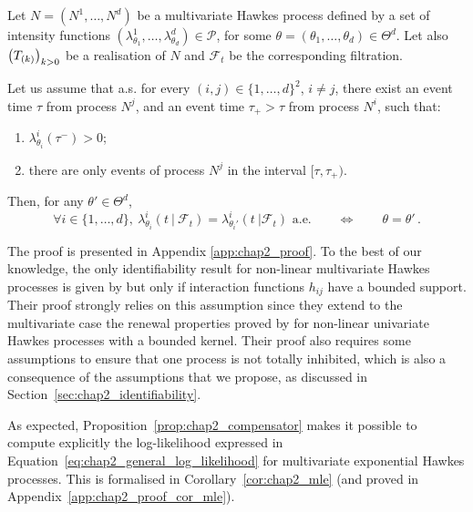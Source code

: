\begin{theorem}[Identifiability]\label{th:chap2_identifiability}
    Let $N=(N^1, \ldots, N^d)$ be a multivariate Hawkes process defined by a set of intensity functions $(\lambda^1_{\theta_1}, \dots, \lambda^d_{\theta_d}) \in \mathcal P$, for some $\theta = (\theta_1, \dots, \theta_d) \in \Theta^d$.
    Let also $\left(T_{(k)} \right)_{k>0}$ be a realisation of $N$ and $\mathcal{F}_t$ be the corresponding filtration.
    
    Let us assume that a.s. for every $(i, j) \in \{1, \dots, d\}^2$, $i\neq j$,
    there exist an event time \(\tau\) from process \(N^j\),
    and an event time \(\tau_+ > \tau\) from process \(N^i\), such that:
    \begin{enumerate}
        \item \label{hyp:chap2_ii} $\lambda_{\theta_i}^i(\tau^-) > 0$;
        \item \label{hyp:chap2_iii} there are only events of process $N^j$ in the interval $[\tau, \tau_+)$.
    \end{enumerate} 
    
    Then, for any $\theta' \in \Theta^d$,
    \[
      \forall i \in \{1, \dots, d\},~
      \lambda_{\theta_i}^i(t ~|~ \mathcal{F}_t) = \lambda_{\theta_i'}^i(t ~| \mathcal{F}_t) \text{ a.e.}
      \qquad
      \iff
      \qquad
      \theta = \theta' \,.
    \]
\end{theorem}

The proof is presented in Appendix \ref{app:chap2_proof}. To the best of our knowledge, the only identifiability result for non-linear multivariate Hawkes processes is given by \textcite{Sulem2021} but only if interaction functions $h_{ij}$ have a bounded support. Their proof strongly relies on this assumption since they extend to the multivariate case the renewal properties proved by \textcite{Costa2020} for non-linear univariate Hawkes processes with a bounded kernel.
Their proof also requires some assumptions to ensure that one process is not totally inhibited, which is also a consequence of the assumptions that we propose, as discussed in Section~\ref{sec:chap2_identifiability}. 

    As expected, Proposition~\ref{prop:chap2_compensator} makes it possible to compute explicitly the log-likelihood expressed in Equation~\eqref{eq:chap2_general_log_likelihood} for multivariate exponential Hawkes processes.
    This is formalised in Corollary~\ref{cor:chap2_mle} (and proved in Appendix~\ref{app:chap2_proof_cor_mle}).

